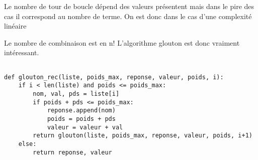 


Le nombre de tour de boucle dépend des valeurs présentent mais dans le pire des cas il correspond au nombre de terme. On est donc dans le cas d'une complexité linéaire




Le nombre de combinaison est en n!
L'algorithme glouton est donc vraiment intéressant.




\begin{lstlisting}

def glouton_rec(liste, poids_max, reponse, valeur, poids, i):
    if i < len(liste) and poids <= poids_max:
        nom, val, pds = liste[i]
        if poids + pds <= poids_max:
            reponse.append(nom)
            poids = poids + pds
            valeur = valeur + val
        return glouton(liste, poids_max, reponse, valeur, poids, i+1)
    else:
        return reponse, valeur

\end{lstlisting}
